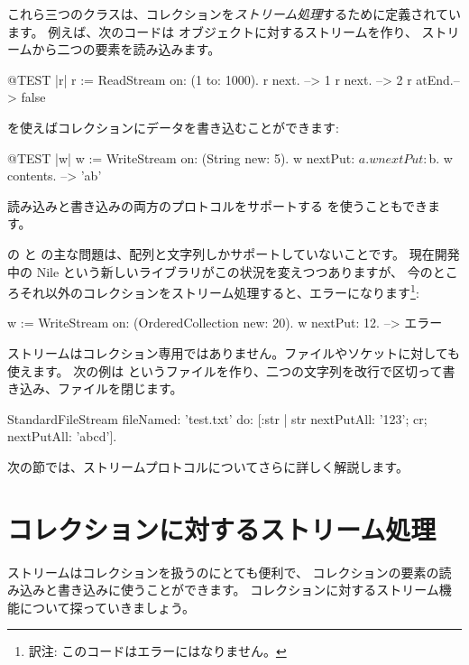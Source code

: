 \documentclass[a4paper,10pt,twoside]{book}
\begin{document}
これら三つのクラスは、コレクションを\emph{ストリーム処理}するために定義されています。
例えば、次のコードは  オブジェクトに対するストリームを作り、
ストリームから二つの要素を読み込みます。
\begin{code}{@TEST |r|}
r := ReadStream on: (1 to: 1000).
r next.   --> 1
r next.   --> 2
r atEnd.--> false
\end{code}

 を使えばコレクションにデータを書き込むことができます:
\begin{code}{@TEST |w|}
w := WriteStream on: (String new: 5).
w nextPut: $a.
w nextPut: $b.
w contents. -->  'ab'
\end{code}

読み込みと書き込みの両方のプロトコルをサポートする  を使うこともできます。

\pharo の  と  の主な問題は、配列と文字列しかサポートしていないことです。
現在開発中の Nile という新しいライブラリがこの状況を変えつつありますが、
今のところそれ以外のコレクションをストリーム処理すると、エラーになります\footnote{訳注: このコードはエラーにはなりません。}: %

\begin{code}{}
w := WriteStream on: (OrderedCollection new: 20).
w nextPut: 12. -->  エラー
\end{code}

ストリームはコレクション専用ではありません。ファイルやソケットに対しても使えます。
次の例は  というファイルを作り、二つの文字列を改行で区切って書き込み、ファイルを閉じます。

\begin{code}{}
StandardFileStream
  fileNamed: 'test.txt'
  do: [:str | str
                nextPutAll: '123';
                cr;
                nextPutAll: 'abcd'].
\end{code}

次の節では、ストリームプロトコルについてさらに詳しく解説します。

\section{コレクションに対するストリーム処理}

ストリームはコレクションを扱うのにとても便利で、
コレクションの要素の読み込みと書き込みに使うことができます。
コレクションに対するストリーム機能について探っていきましょう。
\end{document}

